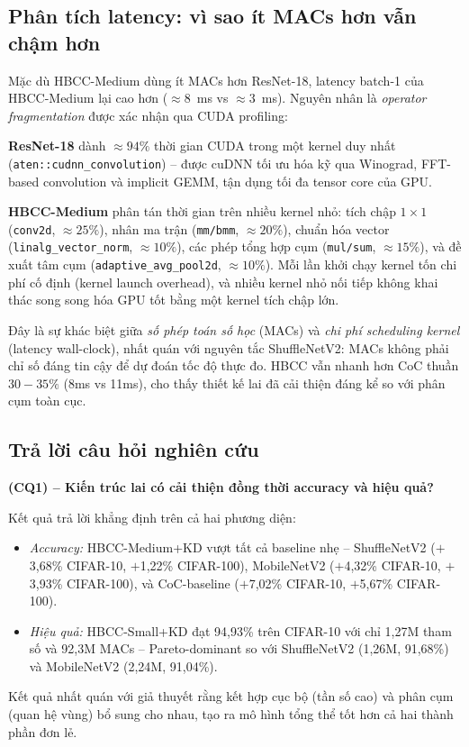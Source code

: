 \documentclass[journal]{IEEEtran}
\begin{document}
\subsection{Phân tích latency: vì sao ít MACs hơn vẫn chậm hơn}
\label{ssec:latency}

Mặc dù HBCC-Medium dùng ít MACs hơn ResNet-18, latency batch-1 của
HBCC-Medium lại cao hơn ($\approx\!8$~ms vs $\approx\!3$~ms). Nguyên
nhân là \textit{operator fragmentation} được xác nhận qua CUDA
profiling:

\noindent\textbf{ResNet-18} dành $\approx\!94\%$ thời gian CUDA trong
một kernel duy nhất (\texttt{aten::cudnn\_convolution}) -- được cuDNN
tối ưu hóa kỹ qua Winograd, FFT-based convolution và implicit GEMM,
tận dụng tối đa tensor core của GPU.

\noindent\textbf{HBCC-Medium} phân tán thời gian trên nhiều kernel
nhỏ: tích chập $1\!\times\!1$ (\texttt{conv2d}, $\approx\!25\%$),
nhân ma trận (\texttt{mm/bmm}, $\approx\!20\%$), chuẩn hóa vector
(\texttt{linalg\_vector\_norm}, $\approx\!10\%$), các phép tổng hợp
cụm (\texttt{mul/sum}, $\approx\!15\%$), và đề xuất tâm cụm
(\texttt{adaptive\_avg\_pool2d}, $\approx\!10\%$). Mỗi lần khởi chạy
kernel tốn chi phí cố định (kernel launch overhead), và nhiều kernel
nhỏ nối tiếp không khai thác song song hóa GPU tốt bằng một kernel
tích chập lớn.

Đây là sự khác biệt giữa \textit{số phép toán số học} (MACs) và
\textit{chi phí scheduling kernel} (latency wall-clock), nhất quán
với nguyên tắc ShuffleNetV2: MACs không phải chỉ số đáng tin cậy
để dự đoán tốc độ thực đo. HBCC vẫn nhanh hơn CoC thuần
$30\!-\!35\%$ (8ms vs 11ms), cho thấy thiết kế lai đã cải thiện
đáng kể so với phân cụm toàn cục.

\subsection{Trả lời câu hỏi nghiên cứu}

\noindent\textbf{(CQ1) -- Kiến trúc lai có cải thiện đồng thời
accuracy và hiệu quả?}

Kết quả trả lời khẳng định trên cả hai phương diện:
\begin{itemize}
  \item \textit{Accuracy:} HBCC-Medium+KD vượt tất cả baseline nhẹ
        -- ShuffleNetV2 ($+$3,68\% CIFAR-10, $+$1,22\% CIFAR-100),
        MobileNetV2 ($+$4,32\% CIFAR-10, $+$3,93\% CIFAR-100), và
        CoC-baseline ($+$7,02\% CIFAR-10, $+$5,67\% CIFAR-100).
  \item \textit{Hiệu quả:} HBCC-Small+KD đạt 94,93\% trên CIFAR-10
        với chỉ 1,27M tham số và 92,3M MACs -- Pareto-dominant so
        với ShuffleNetV2 (1,26M, 91,68\%) và MobileNetV2 (2,24M,
        91,04\%).
\end{itemize}
Kết quả nhất quán với giả thuyết rằng kết hợp cục bộ (tần số cao)
và phân cụm (quan hệ vùng) bổ sung cho nhau, tạo ra mô hình tổng
thể tốt hơn cả hai thành phần đơn lẻ.
\end{document}
